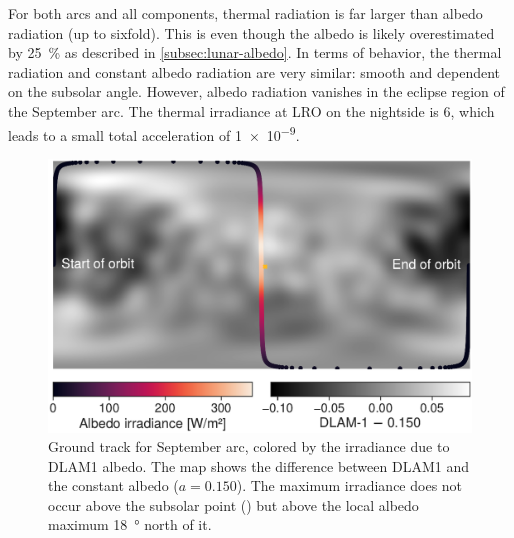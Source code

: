 For both arcs and all components, thermal radiation is far larger than albedo radiation (up to sixfold). This is even though the albedo is likely overestimated by \qty{25}{\percent} as described in \cref{subsec:lunar-albedo}. In terms of behavior, the thermal radiation and constant albedo radiation are very similar: smooth and dependent on the subsolar angle. However, albedo radiation vanishes in the eclipse region of the September arc. The thermal irradiance at \gls{LRO} on the nightside is \qty{6}{\irr}, which leads to a small total acceleration of \qty{1e-9}{\acc}.


\begin{figure}[htb]
    \centering
    \includegraphics[width=\linewidth]{figures/plots/groundtrack.pdf}
    \caption{Ground track for September arc, colored by the irradiance due to \gls{DLAM1} albedo. The map shows the difference between \gls{DLAM1} and the constant albedo ($a=0.150$). The maximum irradiance does not occur above the subsolar point (\textcolor{mpl-yellow}{}) but above the local albedo maximum \qty{18}{\degree} north of it.}
    \label{fig:groundtrack}
\end{figure}


